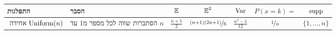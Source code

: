 \documentclass[8pt,twocolumn]{extarticle}
\begin{document}
\ifxetex
{\centering
  { \begin{minipage}{\columnwidth}
      \centering
      \begin{sideways}
        \begin{tabular}{ p{3cm} | p{4cm} | c | c | c | c | c}
          התפלגות  & הסבר
          & $\operatorname*{\mathbb{E}}$ & $\operatorname*{\mathbb{E}}^2$ & $\operatorname{Var}$ & $P(x=k) =$ & $\operatorname{supp}$ \\
          \hline
          אחידה \hfill‏ ‎\(\operatorname{Uniform}(n)\)
                   & הסתברות שווה לכל מספר מ1 עד ‎\(n\)
          & ‎\(\frac{n+1}{2}\)
                  & ‎\(\nicefrac{(n+1)(2n+1)}{6}\)
                            & ‎\(\frac{n^2 -1}{12}\)
                                     & ‎\(\nicefrac{1}{n}\)
                                                  & ‎\(\{1, \dots ,n\}\)\\


\end{tabular}
\end{sideways}
\end{minipage}}}
\end{document}
